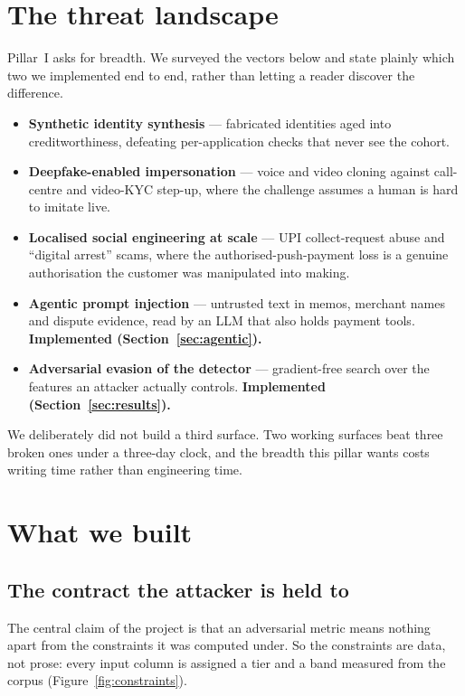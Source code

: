 \documentclass[11pt,a4paper]{article}
\begin{document}
\section{The threat landscape}

Pillar~I asks for breadth. We surveyed the vectors below and state plainly which two we
implemented end to end, rather than letting a reader discover the difference.

\begin{itemize}
  \item \textbf{Synthetic identity synthesis} --- fabricated identities aged into
        creditworthiness, defeating per-application checks that never see the cohort.
  \item \textbf{Deepfake-enabled impersonation} --- voice and video cloning against
        call-centre and video-KYC step-up, where the challenge assumes a human is hard to
        imitate live.
  \item \textbf{Localised social engineering at scale} --- UPI collect-request abuse and
        ``digital arrest'' scams, where the authorised-push-payment loss is a genuine
        authorisation the customer was manipulated into making.
  \item \textbf{Agentic prompt injection} --- untrusted text in memos, merchant names and
        dispute evidence, read by an LLM that also holds payment tools.
        \textbf{Implemented (Section~\ref{sec:agentic}).}
  \item \textbf{Adversarial evasion of the detector} --- gradient-free search over the
        features an attacker actually controls. \textbf{Implemented
        (Section~\ref{sec:results}).}
\end{itemize}

\noindent
We deliberately did not build a third surface. Two working surfaces beat three broken ones
under a three-day clock, and the breadth this pillar wants costs writing time rather than
engineering time.

\section{What we built}

\subsection{The contract the attacker is held to}

The central claim of the project is that an adversarial metric means nothing apart from the
constraints it was computed under. So the constraints are data, not prose: every input
column is assigned a tier and a band measured from the corpus (Figure~\ref{fig:constraints}).
\end{document}
